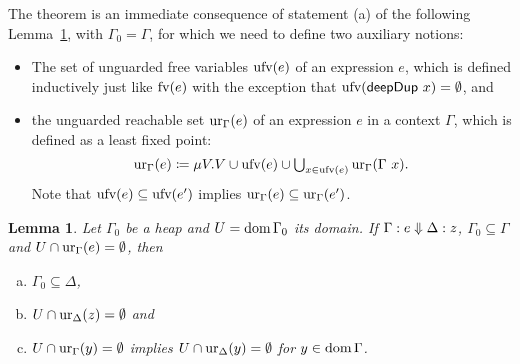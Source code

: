 \documentclass[preprint]{sigplanconf}
\newtheorem{lemma}[theorem]{Lemma}
\theoremstyle{nonumberplain}
\begin{document}
The theorem is an immediate consequence of statement (a) of the following Lemma~\ref{lem:deepdup}, with $\Gamma_0 = \Gamma$, for which we need to define two auxiliary notions:
\begin{itemize}
\item 
The set of unguarded free variables $\text{ufv}(e)$ of an expression $e$, which is defined inductively just like $\text{fv}(e)$ with the exception that $\text{ufv}(\text{\textsf{deepDup}}\ x) = \emptyset$, and 
\item the unguarded reachable set $\text{ur}_{\Gamma}(e)$ of an expression $e$ in a context $\Gamma$, which is defined as a least fixed point:
\[
\text{ur}_{\Gamma}(e) \coloneqq \mu V. V \cup \text{ufv}(e) \cup \textstyle\bigcup_{x\in \text{ufv}(e)}\text{ur}_{\Gamma}(\Gamma\ x).
\]
Note that $\text{ufv}(e) \subseteq \text{ufv}(e')$ implies $\text{ur}_{\Gamma}(e) \subseteq \text{ur}_{\Gamma}(e')$. %
\end{itemize}

\begin{lemma}
\label{lem:deepdup}
Let $\Gamma_0$ be a heap and $U= \text{dom}\,\Gamma_0$ its domain. If $\Gamma : e \Downarrow \Delta : z$, $\Gamma_0 \subseteq \Gamma$ and $U \cap \text{ur}_{\Gamma}(e) = \emptyset$, then
\begin{enumerate}[(a)]
\item $\Gamma_0 \subseteq \Delta$,
\item $U \cap \text{ur}_{\Delta}(z)=\emptyset$ and
\item \label{lem:deepdup:3} $U \cap \text{ur}_{\Gamma}(y) = \emptyset$ implies $U\cap \text{ur}_{\Delta}(y) = \emptyset$ for $y\in \text{dom}\,\Gamma$.
\end{enumerate}
\end{lemma}
\end{document}
